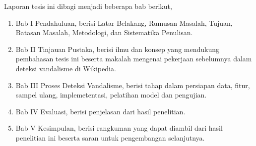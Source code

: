 Laporan tesis ini dibagi menjadi beberapa bab berikut,
\begin{enumerate}
	\item Bab I Pendahuluan, berisi Latar Belakang, Rumusan Masalah,
	Tujuan, Batasan Masalah, Metodologi, dan Sistematika Penulisan.
	\item Bab II Tinjauan Pustaka, berisi ilmu dan konsep yang mendukung
	pembahasan tesis ini beserta makalah mengenai pekerjaan sebelumnya
	dalam deteksi vandalisme di Wikipedia.
	\item Bab III Proses Deteksi Vandalisme, berisi tahap dalam persiapan
	data, fitur, sampel ulang, implemetentasi, pelatihan model dan
	pengujian.
	\item Bab IV Evaluasi, berisi penjelasan dari hasil penelitian.
	\item Bab V Kesimpulan, berisi rangkuman yang dapat diambil dari hasil
	penelitian ini beserta saran untuk pengembangan selanjutnya.
\end{enumerate}
